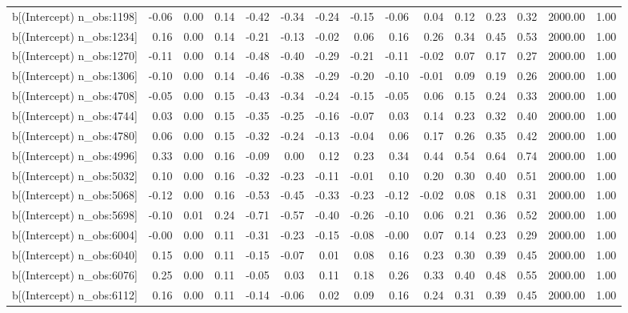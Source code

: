 \begin{table}[ht]
\begin{tabular}{rrrrrrrrrrrrrrr}
  b[(Intercept) n\_obs:1198] & -0.06 & 0.00 & 0.14 & -0.42 & -0.34 & -0.24 & -0.15 & -0.06 & 0.04 & 0.12 & 0.23 & 0.32 & 2000.00 & 1.00 \\ 
  b[(Intercept) n\_obs:1234] & 0.16 & 0.00 & 0.14 & -0.21 & -0.13 & -0.02 & 0.06 & 0.16 & 0.26 & 0.34 & 0.45 & 0.53 & 2000.00 & 1.00 \\ 
  b[(Intercept) n\_obs:1270] & -0.11 & 0.00 & 0.14 & -0.48 & -0.40 & -0.29 & -0.21 & -0.11 & -0.02 & 0.07 & 0.17 & 0.27 & 2000.00 & 1.00 \\ 
  b[(Intercept) n\_obs:1306] & -0.10 & 0.00 & 0.14 & -0.46 & -0.38 & -0.29 & -0.20 & -0.10 & -0.01 & 0.09 & 0.19 & 0.26 & 2000.00 & 1.00 \\ 
  b[(Intercept) n\_obs:4708] & -0.05 & 0.00 & 0.15 & -0.43 & -0.34 & -0.24 & -0.15 & -0.05 & 0.06 & 0.15 & 0.24 & 0.33 & 2000.00 & 1.00 \\ 
  b[(Intercept) n\_obs:4744] & 0.03 & 0.00 & 0.15 & -0.35 & -0.25 & -0.16 & -0.07 & 0.03 & 0.14 & 0.23 & 0.32 & 0.40 & 2000.00 & 1.00 \\ 
  b[(Intercept) n\_obs:4780] & 0.06 & 0.00 & 0.15 & -0.32 & -0.24 & -0.13 & -0.04 & 0.06 & 0.17 & 0.26 & 0.35 & 0.42 & 2000.00 & 1.00 \\ 
  b[(Intercept) n\_obs:4996] & 0.33 & 0.00 & 0.16 & -0.09 & 0.00 & 0.12 & 0.23 & 0.34 & 0.44 & 0.54 & 0.64 & 0.74 & 2000.00 & 1.00 \\ 
  b[(Intercept) n\_obs:5032] & 0.10 & 0.00 & 0.16 & -0.32 & -0.23 & -0.11 & -0.01 & 0.10 & 0.20 & 0.30 & 0.40 & 0.51 & 2000.00 & 1.00 \\ 
  b[(Intercept) n\_obs:5068] & -0.12 & 0.00 & 0.16 & -0.53 & -0.45 & -0.33 & -0.23 & -0.12 & -0.02 & 0.08 & 0.18 & 0.31 & 2000.00 & 1.00 \\ 
  b[(Intercept) n\_obs:5698] & -0.10 & 0.01 & 0.24 & -0.71 & -0.57 & -0.40 & -0.26 & -0.10 & 0.06 & 0.21 & 0.36 & 0.52 & 2000.00 & 1.00 \\ 
  b[(Intercept) n\_obs:6004] & -0.00 & 0.00 & 0.11 & -0.31 & -0.23 & -0.15 & -0.08 & -0.00 & 0.07 & 0.14 & 0.23 & 0.29 & 2000.00 & 1.00 \\ 
  b[(Intercept) n\_obs:6040] & 0.15 & 0.00 & 0.11 & -0.15 & -0.07 & 0.01 & 0.08 & 0.16 & 0.23 & 0.30 & 0.39 & 0.45 & 2000.00 & 1.00 \\ 
  b[(Intercept) n\_obs:6076] & 0.25 & 0.00 & 0.11 & -0.05 & 0.03 & 0.11 & 0.18 & 0.26 & 0.33 & 0.40 & 0.48 & 0.55 & 2000.00 & 1.00 \\ 
  b[(Intercept) n\_obs:6112] & 0.16 & 0.00 & 0.11 & -0.14 & -0.06 & 0.02 & 0.09 & 0.16 & 0.24 & 0.31 & 0.39 & 0.45 & 2000.00 & 1.00 \\ 

\end{tabular}
\end{table}
